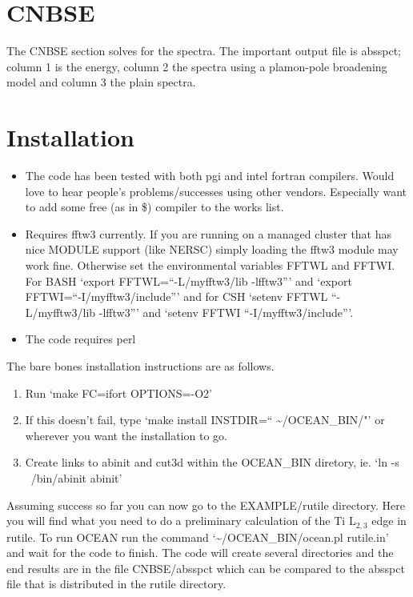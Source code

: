 \documentclass[11pt]{report}
\begin{document}
\chapter{ CNBSE }
The CNBSE section solves for the spectra. The important output file is absspct; column 1 is the energy, 
column 2 the spectra using a plamon-pole broadening model and column 3 the plain spectra.

\appendix
\chapter{Installation}
\begin{itemize}
\item The code has been tested with both pgi and intel fortran compilers. Would love to hear people's problems/successes using other vendors. Especially want to add some free (as in \$) compiler to the works list.
\item Requires fftw3 currently. If you are running on a managed cluster that has nice MODULE support (like NERSC) simply loading the fftw3 module may work fine. Otherwise set the environmental variables FFTWL and FFTWI. For BASH `export FFTWL=``-L/myfftw3/lib -lfftw3''' and `export FFTWI=``-I/myfftw3/include''' and for CSH `setenv FFTWL ``-L/myfftw3/lib -lfftw3''' and `setenv FFTWI ``-I/myfftw3/include'''.
\item The code requires perl
\end{itemize}

The bare bones installation instructions are as follows.

\begin{enumerate}
\item{ Run `make FC=ifort OPTIONS=-O2'}
\item{ If this doesn't fail, type `make install INSTDIR=`` \textasciitilde/OCEAN\_BIN/"' or wherever you want the installation to go.}
\item{ Create links to abinit and cut3d within the OCEAN\_BIN diretory, ie. `ln -s ~/bin/abinit abinit'}
\end{enumerate}

Assuming success so far you can now go to the EXAMPLE/rutile directory. Here you will find what you need to do a preliminary 
calculation of the Ti L$_{2,3}$ edge in rutile. To run OCEAN run the command `\textasciitilde/OCEAN\_BIN/ocean.pl rutile.in' 
and wait for the code to finish. The code will create several directories and the end results are in the file CNBSE/absspct which can 
be compared to the absspct file that is distributed in the rutile directory.  


\end{document}
